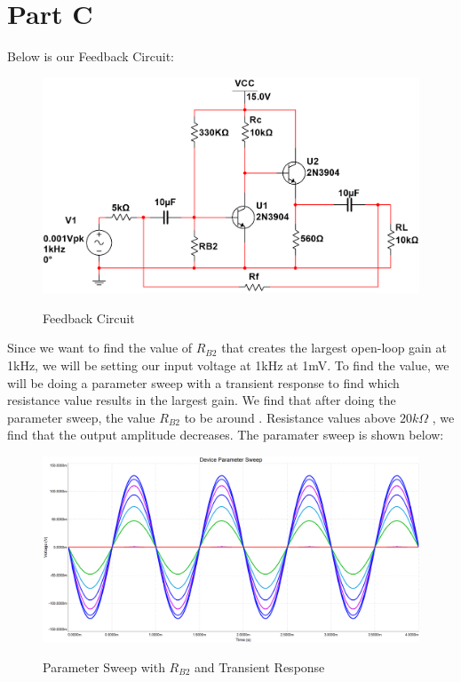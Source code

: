 \documentclass[12pt]{article}
\begin{document}
\section{Part C}
Below is our Feedback Circuit:
\begin{figure}[H]
    \centering
    \includegraphics[height=0.25\textwidth]{Images/partCcircuit.png}\\
    \caption{Feedback Circuit}
    \label{fig:feedbackcircuit}
\end{figure}

Since we want to find the value of $R_{B2}$ that creates the largest open-loop gain at 1kHz, we will be setting our
input voltage at 1kHz at 1mV. To find the value, we will be doing a parameter sweep with a transient response to 
find which resistance value results in the largest gain. We find that after doing the parameter sweep,
the value $R_{B2}$ to be around . Resistance values above $20k\Omega$
, we find that the output amplitude decreases. The paramater sweep is shown below:

\begin{figure}[h!]
    \centering
    \includegraphics[height=0.4\textwidth]{Images/parametersweep.png}\\
    \caption{Parameter Sweep with $R_{B2}$ and Transient Response}
    \label{fig:parametersweep}
\end{figure}
\end{document}
